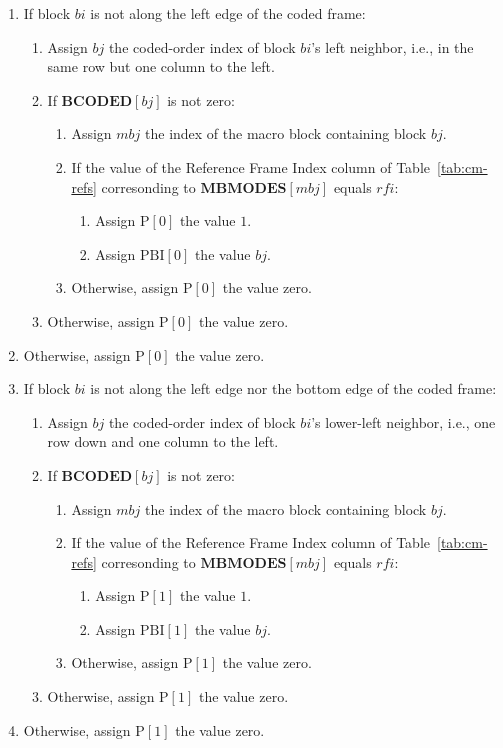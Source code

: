 \documentclass[9pt,letterpaper]{book}
\newcommand{\idx}[1]{{\ensuremath{\mathit{#1}}}}
\newcommand{\bi}{\idx{bi}}
\newcommand{\bj}{\idx{bj}}
\newcommand{\mbj}{\idx{mbj}}
\newcommand{\rfi}{\idx{rfi}}
\newcommand{\bitvar}[1]{\ensuremath{\mathbf{\bm{#1}}}}
\newcommand{\locvar}[1]{\ensuremath{\mathrm{#1}}}
\numberwithin{equation}{chapter}
\numberwithin{figure}{chapter}
\numberwithin{table}{chapter}
\begin{document}
\begin{enumerate}
\item
If block \bitvar{\bi} is not along the left edge of the coded frame:
\begin{enumerate}
\item
Assign \locvar{\bj} the coded-order index of block \bitvar{\bi}'s left
 neighbor, i.e., in the same row but one column to the left.
\item
If $\bitvar{BCODED}[\bj]$ is not zero:
\begin{enumerate}
\item
Assign \locvar{\mbj} the index of the macro block containing block
 \locvar{\bj}.
\item
If the value of the Reference Frame Index column of Table~\ref{tab:cm-refs}
 corresonding to $\bitvar{MBMODES}[\locvar{\mbj}]$ equals \locvar{\rfi}:
\begin{enumerate}
\item
Assign $\locvar{P}[0]$ the value $1$.
\item
Assign $\locvar{PBI}[0]$ the value \locvar{\bj}.
\end{enumerate}
\item
Otherwise, assign $\locvar{P}[0]$ the value zero.
\end{enumerate}
\item
Otherwise, assign $\locvar{P}[0]$ the value zero.
\end{enumerate}
\item
Otherwise, assign $\locvar{P}[0]$ the value zero.

\item
If block \bitvar{\bi} is not along the left edge nor the bottom edge of the
 coded frame:
\begin{enumerate}
\item
Assign \locvar{\bj} the coded-order index of block \bitvar{\bi}'s lower-left
 neighbor, i.e., one row down and one column to the left.
\item
If $\bitvar{BCODED}[\bj]$ is not zero:
\begin{enumerate}
\item
Assign \locvar{\mbj} the index of the macro block containing block
 \locvar{\bj}.
\item
If the value of the Reference Frame Index column of Table~\ref{tab:cm-refs}
 corresonding to $\bitvar{MBMODES}[\locvar{\mbj}]$ equals \locvar{\rfi}:
\begin{enumerate}
\item
Assign $\locvar{P}[1]$ the value $1$.
\item
Assign $\locvar{PBI}[1]$ the value \locvar{\bj}.
\end{enumerate}
\item
Otherwise, assign $\locvar{P}[1]$ the value zero.
\end{enumerate}
\item
Otherwise, assign $\locvar{P}[1]$ the value zero.
\end{enumerate}
\item
Otherwise, assign $\locvar{P}[1]$ the value zero.


\end{enumerate}
\end{document}
